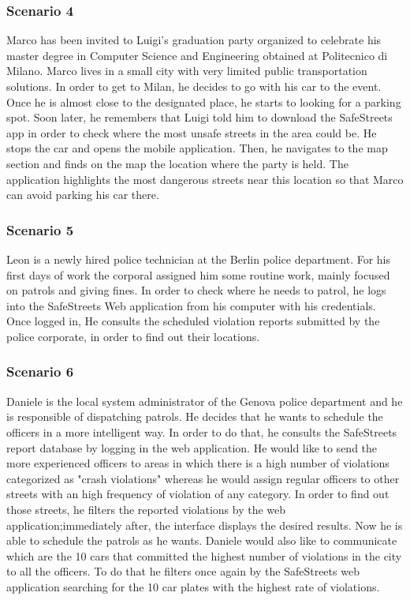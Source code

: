 \subsubsection{Scenario 4}
Marco has been invited to Luigi's graduation party organized to celebrate his master degree in Computer Science and Engineering obtained at Politecnico di Milano. Marco lives in a small city with very limited public transportation solutions. In order to get to Milan, he decides to go with his car to the event. Once he is almost close to the designated place, he starts to looking for a parking spot. Soon later, he remembers that Luigi told him to download the SafeStreets app in order to check where the most unsafe streets in the area could be. He stops the car and opens the mobile application. Then, he navigates to the map section and finds on the map the location where the party is held. The application highlights the most dangerous streets near this location so that Marco can avoid parking his car there.

\subsubsection{Scenario 5}
Leon is a newly hired police technician at the Berlin police department. For his first days of work the corporal assigned  him some routine work, mainly focused on patrols and giving fines. In order to check where he needs to patrol, he logs into the SafeStreets Web application from his computer with his credentials. Once logged in, He consults the scheduled violation reports submitted by the police corporate, in order to find out their locations. 

\subsubsection{Scenario 6}
Daniele is the local system administrator of the Genova police department and he is responsible of dispatching patrols. He decides that he wants to schedule the officers in a more intelligent way. In order to do that, he consults the SafeStreets report database by logging in the web application. He would like to send the more experienced officers to areas in which there is a high number of violations categorized as "crash violations" whereas he would assign regular officers to other streets with an high frequency of violation of any category. In order to find out those streets, he filters the reported violations by the web application;immediately after, the interface displays the desired results. Now he is able to schedule the patrols as he wants. Daniele would also like to communicate which are the 10 cars that committed the highest number of violations in the city to all the officers. To do that he filters once again by the SafeStreets web application searching for the 10 car plates with the highest rate of violations.

